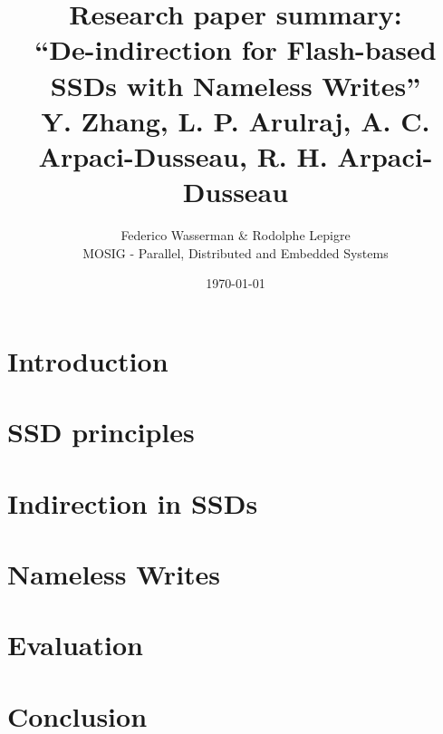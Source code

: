 \documentclass[twocolumn,a4paper,10pt]{article}
\begin{document}
\title{Research paper summary:\\
       ``De-indirection for Flash-based SSDs with Nameless Writes''\\
       \small{Y. Zhang, L. P. Arulraj, A. C. Arpaci-Dusseau, R. H. Arpaci-Dusseau}}
\author{Federico Wasserman \& Rodolphe Lepigre\\
        MOSIG - Parallel, Distributed and Embedded Systems}
\date{\today}
\maketitle

\begin{abstract}
\end{abstract}

\section*{Introduction}

\section*{SSD principles}

\section*{Indirection in SSDs}

\section*{Nameless Writes}

\section*{Evaluation}

\section*{Conclusion}

% 
% 
\end{document}
